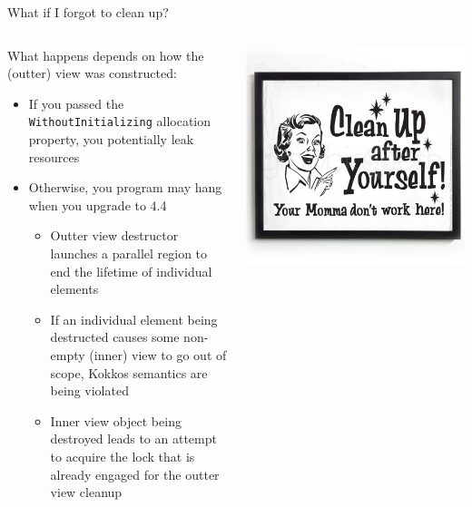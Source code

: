 
\begin{frame}[fragile]{What if I forgot to clean up?}

\begin{columns}
\begin{column}{0.65\textwidth}
    What happens depends on how the (outter) view was constructed:
    \begin{itemize}
    \item If you passed the \texttt{WithoutInitializing} allocation property, you potentially leak resources
    \item Otherwise, you program may hang when you upgrade to 4.4
        \begin{itemize}
        \item Outter view destructor launches a parallel region to end the lifetime of individual elements
        \item If an individual element being destructed causes some non-empty (inner) view to go out of scope, Kokkos semantics are being violated
        \item Inner view object being destroyed leads to an attempt to acquire the lock that is already engaged for the outter view cleanup
        \end{itemize}
    \end{itemize}
\end{column}
\begin{column}{0.35\textwidth}
    \begin{center}
    \includegraphics[width=\linewidth]{4_4/cleanupafteryourself}
    \end{center}
\end{column}
\end{columns}

\end{frame}

